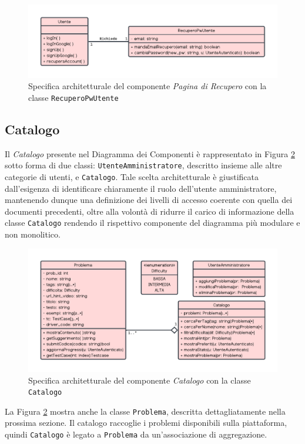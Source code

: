 \documentclass[11pt, a4paper]{article}
\theoremstyle{definition} %
\begin{document}
\begin{figure}[H]
\centering
\hspace*{-1.5cm}
\includegraphics[scale = 0.8]{materiale/class-recupero.pdf}
\caption{Specifica architetturale del componente \textit{Pagina di Recupero} con la classe \texttt{RecuperoPwUtente}}
\label{recupero}
\end{figure}



\newpage
\subsection{Catalogo}
Il \textit{Catalogo} presente nel Diagramma dei Componenti è rappresentato in
Figura \ref{catalog} sotto forma di due classi: \texttt{UtenteAmministratore}, descritto insieme
alle altre categorie di utenti, e \texttt{Catalogo}. Tale scelta architetturale
è giustificata dall'esigenza di identificare chiaramente il ruolo dell'utente
amministratore, mantenendo dunque una definizione dei livelli di accesso
coerente con quella dei documenti precedenti, oltre alla volontà di ridurre il
carico di informazione della classe \texttt{Catalogo} rendendo il rispettivo
componente del diagramma più modulare e non monolitico.
\begin{figure}[H]
\centering
\hspace*{-0.8cm}
\includegraphics[scale = 0.72]{materiale/class-catalogo.pdf}
\caption{Specifica architetturale del componente \textit{Catalogo} con la classe \texttt{Catalogo}}
\label{catalog}
\end{figure}
\noindent La Figura \ref{catalog} mostra anche la classe \texttt{Problema},
descritta dettagliatamente nella prossima sezione. Il catalogo
raccoglie i problemi disponibili sulla piattaforma, quindi \texttt{Catalogo}
è legato a \texttt{Problema} da un'associazione di aggregazione.
\end{document}
